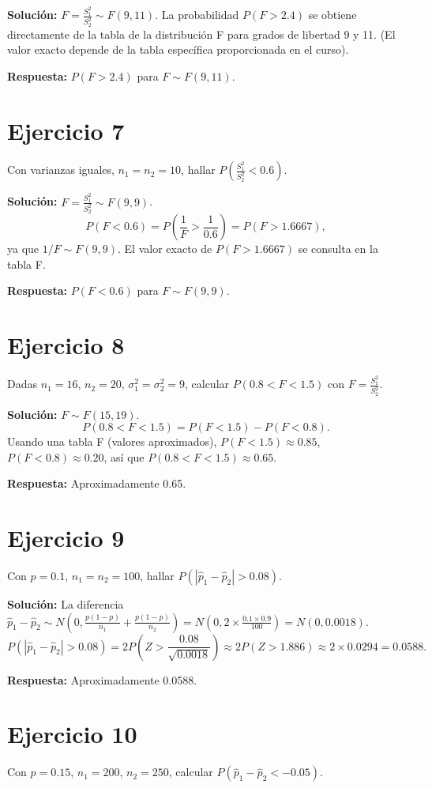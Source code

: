 \documentclass{article}
\begin{document}
\textbf{Solución:}  
$F = \frac{S_1^2}{S_2^2} \sim F(9, 11)$. La probabilidad $P(F > 2.4)$ se obtiene directamente de la tabla de la distribución F para grados de libertad 9 y 11. (El valor exacto depende de la tabla específica proporcionada en el curso).

\textbf{Respuesta:} $P(F > 2.4)$ para $F \sim F(9, 11)$.

\section{Ejercicio 7}
Con varianzas iguales, $n_1 = n_2 = 10$, hallar $P\left( \frac{S_1^2}{S_2^2} < 0.6 \right)$.

\textbf{Solución:}  
$F = \frac{S_1^2}{S_2^2} \sim F(9, 9)$.  
\[ P(F < 0.6) = P\left( \frac{1}{F} > \frac{1}{0.6} \right) = P(F > 1.6667), \]  
ya que $1/F \sim F(9, 9)$. El valor exacto de $P(F > 1.6667)$ se consulta en la tabla F.

\textbf{Respuesta:} $P(F < 0.6)$ para $F \sim F(9, 9)$.

\section{Ejercicio 8}
Dadas $n_1 = 16$, $n_2 = 20$, $\sigma_1^2 = \sigma_2^2 = 9$, calcular $P(0.8 < F < 1.5)$ con $F = \frac{S_1^2}{S_2^2}$.

\textbf{Solución:}  
$F \sim F(15, 19)$.  
\[ P(0.8 < F < 1.5) = P(F < 1.5) - P(F < 0.8). \]  
Usando una tabla F (valores aproximados), $P(F < 1.5) \approx 0.85$, $P(F < 0.8) \approx 0.20$, así que $P(0.8 < F < 1.5) \approx 0.65$.

\textbf{Respuesta:} Aproximadamente 0.65.

\section{Ejercicio 9}
Con $p = 0.1$, $n_1 = n_2 = 100$, hallar $P(|\hat{p}_1 - \hat{p}_2| > 0.08)$.

\textbf{Solución:}  
La diferencia $\hat{p}_1 - \hat{p}_2 \sim N\left(0, \frac{p(1-p)}{n_1} + \frac{p(1-p)}{n_2}\right) = N(0, 2 \times \frac{0.1 \times 0.9}{100}) = N(0, 0.0018)$.  
\[ P(|\hat{p}_1 - \hat{p}_2| > 0.08) = 2 P\left( Z > \frac{0.08}{\sqrt{0.0018}} \right) \approx 2 P(Z > 1.886) \approx 2 \times 0.0294 = 0.0588. \]

\textbf{Respuesta:} Aproximadamente 0.0588.

\section{Ejercicio 10}
Con $p = 0.15$, $n_1 = 200$, $n_2 = 250$, calcular $P(\hat{p}_1 - \hat{p}_2 < -0.05)$.
\end{document}
